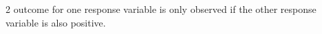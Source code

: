 \documentclass[12pt]{article}
\begin{document}
\begin{spacing}{2}
outcome for one response variable is only observed if the other response variable is also
positive. 


\end{spacing}
\end{document}
